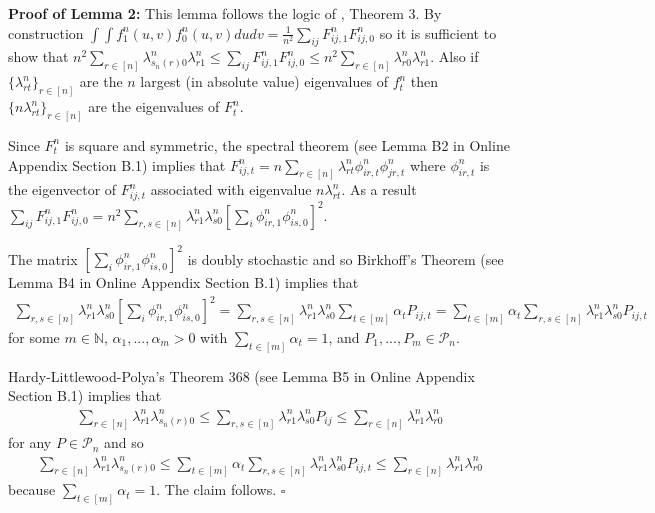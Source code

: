\documentclass[12pt]{article}
\theoremstyle{definition}
\begin{document}
\begin{flushleft}
\textbf{Proof of Lemma 2:} This lemma follows the logic of \cite{finke1987quadratic}, Theorem 3. By construction $\int\int f^{n}_{1}(u,v)f^{n}_{0}(u,v)dudv = \frac{1}{n^{2}}\sum_{ij}F_{ij,1}^{n}F_{ij,0}^{n}$ so it is sufficient to show that $n^2\sum_{r \in [n]}\lambda^{n}_{s_{n}(r)0}\lambda^{n}_{r1} \leq \sum_{ij} F^{n}_{ij,1}F^{n}_{ij,0} \leq n^2\sum_{r \in [n]}\lambda^{n}_{r0}\lambda^{n}_{r1}$. Also if  $\{\lambda_{rt}^{n}\}_{r \in [n]}$ are the $n$ largest (in absolute value) eigenvalues of $f_{t}^{n}$  then $\{n\lambda_{rt}^{n}\}_{r \in [n]}$ are the eigenvalues of $F_{t}^{n}$.  \newline

Since $F^{n}_{t}$ is square and symmetric, the spectral theorem (see Lemma B2 in Online Appendix Section B.1) implies that $F_{ij,t}^{n} = n\sum_{r \in [n]}\lambda_{rt}^{n}\phi_{ir,t}^{n}\phi_{jr,t}^{n}$ where $\phi_{ir,t}^{n}$ is the eigenvector of $F_{ij,t}^{n}$ associated with eigenvalue $n\lambda_{rt}^{n}$. As a result $\sum_{ij}F_{ij,1}^{n}F_{ij,0}^{n} = n^2\sum_{r,s \in [n]}\lambda_{r1}^{n}\lambda_{s0}^{n}\left[\sum_{i}\phi_{ir,1}^{n}\phi_{is,0}^{n}\right]^{2}$. \newline

The matrix $\left[\sum_{i}\phi_{ir,1}^{n}\phi_{is,0}^{n}\right]^{2}$ is doubly stochastic and so Birkhoff's Theorem (see Lemma B4 in Online Appendix Section B.1)  implies that 
\begin{align*}
\sum_{r,s \in [n]}\lambda_{r1}^{n}\lambda_{s0}^{n}\left[\sum_{i}\phi_{ir,1}^{n}\phi_{is,0}^{n}\right]^{2} 
 =  \sum_{r,s \in [n]}\lambda_{r1}^{n}\lambda_{s0}^{n}\sum_{t\in[m]}\alpha_{t}P_{ij,t} 
 =  \sum_{t\in[m]}\alpha_{t}\sum_{r,s \in [n]}\lambda_{r1}^{n}\lambda_{s0}^{n}P_{ij,t}
 \end{align*}
 for some $m \in \mathbb{N}$, $\alpha_{1},...,\alpha_{m} > 0$ with $\sum_{t\in[m]}\alpha_{t} = 1$, and $P_{1},...,P_{m} \in \mathcal{P}_{n}$.  \newline
 
 Hardy-Littlewood-Polya's Theorem 368 (see Lemma B5 in Online Appendix Section B.1) implies that
 \begin{align*}
  \sum_{r \in [n]}\lambda_{r1}^{n}\lambda_{s_{n}(r)0}^{n} 
  \leq \sum_{r,s \in [n]}\lambda_{r1}^{n}\lambda_{s0}^{n}P_{ij} 
  \leq \sum_{r \in [n]}\lambda_{r1}^{n}\lambda_{r0}^{n}
  \end{align*}
   for any $P \in \mathcal{P}_{n}$ and so 
    \begin{align*}
  \sum_{r \in [n]}\lambda_{r1}^{n}\lambda_{s_{n}(r)0}^{n} 
  \leq \sum_{t\in[m]}\alpha_{t}\sum_{r,s \in [n]}\lambda_{r1}^{n}\lambda_{s0}^{n}P_{ij,t}
  \leq \sum_{r \in [n]}\lambda_{r1}^{n}\lambda_{r0}^{n}
  \end{align*}
  because $\sum_{t \in [m]}\alpha_{t} = 1$. The claim follows. $\square$
\end{flushleft}
\end{document}
